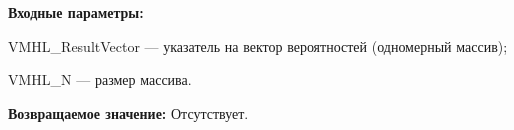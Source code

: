\textbf{Входные параметры:}

 VMHL\_ResultVector --- указатель на вектор вероятностей (одномерный массив);
 
 VMHL\_N --- размер массива.

\textbf{Возвращаемое значение:}
Отсутствует.